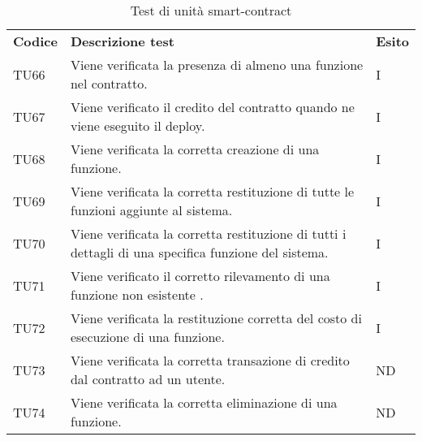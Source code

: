\renewcommand{\arraystretch}{1.5}
\begin{longtable}{|C{1.5cm}|C{10cm}|C{1.5cm}|}
	
	\caption{Test di unità smart-contract}\\
	\hline
	
	\textbf{Codice} & \textbf{Descrizione test}  & \textbf{Esito}
	\tabularnewline
	\endfirsthead
	
	TU66 &
	Viene verificata la presenza di almeno una funzione nel contratto.  &
	I \\
	
	TU67 &
	Viene verificato il credito del contratto quando ne viene eseguito il deploy.  &
	I \\
	
	TU68 &
	Viene verificata la corretta creazione di una funzione.  &
	I \\
	
	TU69 &
	Viene verificata la corretta restituzione di tutte le funzioni aggiunte al sistema.  &
	I \\
	
	TU70 &
	Viene verificata la corretta restituzione di tutti i dettagli di una specifica funzione del sistema.  &
	I \\
	
	TU71 &
	Viene verificato il corretto rilevamento di una funzione non esistente .  &
	I \\
	
	
	TU72 &
	Viene verificata la restituzione corretta del costo  di esecuzione di una funzione.  &
	I \\
	
	
	
	TU73 &
	Viene verificata la corretta transazione di credito dal contratto ad un utente.  &
	ND \\
	
	TU74 &
	Viene verificata la corretta eliminazione di una funzione.  &
	ND \\
	

\end{longtable}
